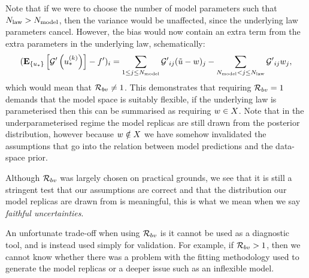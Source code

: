 Note that if we were to choose the number of model parameters such that $N_{\rm law} >
N_{\rm model}$, then the variance would be unaffected, since the underlying law
parameters cancel. However, the bias would now contain an extra term from the
extra parameters in the underlying law, schematically:
\begin{equation}
    \begin{split}
        (\mathbf{E}_{\{ u_* \}} \left[ {{\mathcal{G}}^{\prime}}\left(u_*^{(k)}\right) \right] - {{f}^{\prime}})_i =
        \sum_{1 \leq j \leq N_{\rm model}} {{\mathcal{G}}^{\prime}}_{ij} (\tilde{u} - w)_j -
        \sum_{N_{\rm model} < j \leq N_{\rm law}} {{\mathcal{G}}^{\prime}}_{ij} w_j,
    \end{split}
\end{equation}
which would mean that $\mathcal{R}_{bv} \neq 1$. This demonstrates that requiring
$\mathcal{R}_{bv} = 1$ demands that the model space is suitably flexible, if the
underlying law is parameterised then this can be summarised as requiring
$w \in X$. Note that in the underparameterised regime the
model replicas are still drawn from the posterior distribution, however because
$w \notin X$ we have somehow invalidated the assumptions that
go into the relation between model predictions and the data-space prior.

Although $\mathcal{R}_{bv}$ was largely chosen on practical grounds, we see that it
is still a stringent test that our assumptions are correct and that the
distribution our model replicas are drawn from is meaningful, this is what we
mean when we say {\em faithful uncertainties}.

An unfortunate trade-off when using $\mathcal{R}_{bv}$ is it cannot be used as a
diagnostic tool, and is instead used simply for validation. For example, if
$\mathcal{R}_{bv} > 1$, then we cannot know whether there was a problem with the
fitting methodology used to generate the model replicas or a deeper issue such
as an inflexible model.

